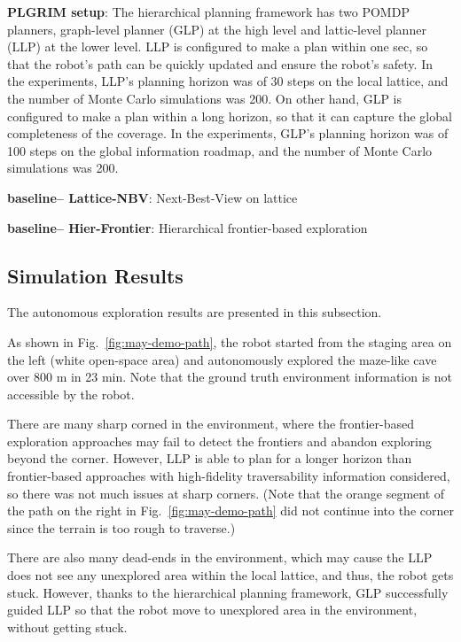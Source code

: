 \documentclass{article}
\newcommand{\ph}[1]{{\textbf{#1}:}} %
\begin{document}
\ph{PLGRIM setup}
The hierarchical planning framework has two POMDP planners, graph-level planner (GLP) at the high level and lattic-level planner (LLP) at the lower level.
LLP is configured to make a plan within one sec, so that the robot's path can be quickly updated and ensure the robot's safety.
In the experiments, LLP's planning horizon was of 30 steps on the local lattice, and the number of Monte Carlo simulations was 200.
On other hand, GLP is configured to make a plan within a long horizon, so that it can capture the global completeness of the coverage.
In the experiments, GLP's planning horizon was of 100 steps on the global information roadmap, and the number of Monte Carlo simulations was 200.


\ph{baseline-- Lattice-NBV} Next-Best-View on lattice

\ph{baseline-- Hier-Frontier} Hierarchical frontier-based exploration





\subsection{Simulation Results}

The autonomous exploration results are presented in this subsection. %

As shown in Fig.~\ref{fig:may-demo-path}, the robot started from the staging area on the left (white open-space area) and autonomously explored the maze-like cave over 800 m in 23 min.
Note that the ground truth environment information is not accessible by the robot.

There are many sharp corned in the environment, where the frontier-based exploration approaches may fail to detect the frontiers and abandon exploring beyond the corner.
However, LLP is able to plan for a longer horizon than frontier-based approaches with high-fidelity traversability information considered, so there was not much issues at sharp corners.
(Note that the orange segment of the path on the right in Fig.~\ref{fig:may-demo-path} did not continue into the corner since the terrain is too rough to traverse.)

There are also many dead-ends in the environment, which may cause the LLP does not see any unexplored area within the local lattice, and thus, the robot gets stuck.
However, thanks to the hierarchical planning framework, GLP successfully guided LLP so that the robot move to unexplored area in the environment, without getting stuck.
\end{document}
